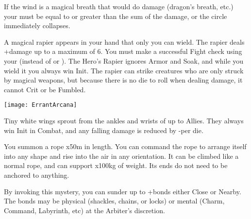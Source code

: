 {If the wind is a magical breath that would do damage (dragon's breath, etc.) your \SUMDICE must be equal to or greater than the sum of the damage, or the circle immediately collapses.  

\MYSTERY [
  Name = Corsair's Blade,
  Link = arcana-mystery-corsairs-blade,
  Paradigm = Force,
  Save = n/a,
  Duration = Session,
  Target = Self
]

A magical rapier appears in your hand that only you can wield.  The rapier deals \DICE+\DICE damage up to a maximum of 6.  You must make a successful Fight check using your \FOC (instead of \VIG or \DEX).  The Hero's Rapier ignores Armor and Soak, and while you wield it you always win Init. The rapier can strike creatures who are only struck by magical weapons, but because there is no die to roll when dealing damage, it cannot Crit or be Fumbled.  


  \begin{center}
  \texttt{[image: ErrantArcana]}
  \end{center}



\MYSTERY [
  Name = Duelists' Wings,
  Link = arcana-mystery-duelists-wings,
  Paradigm = Biomancy,
  Save = n/a,
  Duration = Combat or \SUM Minutes,
  Target = Self or Close Target(s)
]

Tiny white wings sprout from the ankles and wrists of up to \DICE Allies.  They always win Init in Combat, and any falling damage is reduced by -\DICE per die.

\MYSTERY [
  Name = Ropework,
  Link = arcana-mystery-ropework,
  Paradigm = Entropy,
  Save = N,
  Duration = \SUM Minutes,
  Target = Close Target(s)
]

You summon a rope \DICE x50m in length.  You can command the rope to arrange itself into any shape and rise into the air in any orientation.  It can be climbed like a normal rope, and can support \DICE x100kg of weight.  Its ends do not need to be anchored to anything.

\MYSTERY [
  Name = Shatter Bonds,
  Link = arcana-mystery-shatter-bonds,
  Paradigm = Force,
  Save = n/a,
  Duration = Instant,
  Target = Close or Nearby
]

By invoking this mystery, you can sunder up to \DICE+\DICE bonds either Close or Nearby.  The bonds may be physical (shackles, chains, or locks) or mental (Charm, Command, Labyrinth, etc) at the Arbiter's discretion.

\MYSTERY [
  Name = Skald's Tongue,
  Link = arcana-mystery-skalds-tongue,
  Paradigm = Entropy,
  Save = n/a,
  Duration = Breather or Bivouac,
  Target = Close Target(s)
]

}
